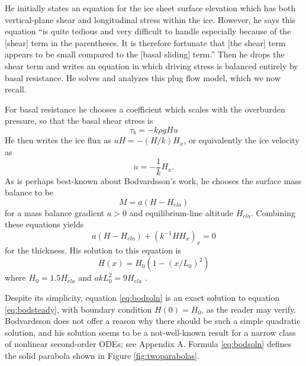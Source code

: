 \documentclass[review,letterpaper]{igs}
\begin{document}
He initially states an equation for the ice sheet surface elevation which has both vertical-plane shear and longitudinal stress within the ice.  However, he says this equation ``is quite tedious and very difficult to handle especially because of the [shear] term in the parentheses.  It is therefore fortunate that [the shear] term appears to be small compared to the [basal sliding] term.''  Then he drops the shear term and writes an equation in which driving stress is balanced entirely by basal resistance.  He solves and analyzes this plug flow model, which we now recall.

For basal resistance he chooses a coefficient which scales with the overburden pressure, so that the basal shear stress is
\begin{equation}
\tau_b = - k \rho g H u  \label{eq:bodstresschoice}
\end{equation}
He then writes the ice flux as $uH=-(H/k) H_x$, or equivalently the ice velocity as
\begin{equation}
u = - \frac{1}{k} H_x. \label{eq:bodvelocity}
\end{equation}
As is perhaps best-known about Bodvardsson's work, he chooses the surface mass balance to be
\begin{equation}
M = a (H - H_{ela})  \label{eq:bodmassbalance}
\end{equation}
for a mass balance gradient $a>0$ and equilibrium-line altitude $H_{ela}$.  Combining these equations yields \citep[equation (17)]{Bodvardsson}
\begin{equation}
a (H - H_{ela}) + (k^{-1} H H_x)_x = 0  \label{eq:bodsteady}
\end{equation}
for the thickness.  His solution to this equation is \citep[equivalent equations (18) and (23)]{Bodvardsson}
\begin{equation}
H(x) = H_0 (1 - (x/L_0)^2)  \label{eq:bodsoln}
\end{equation}
where $H_0 = 1.5 H_{ela}$ and $a k L_0^2 = 9 H_{ela}$ \citep[equation (24)]{Bodvardsson}.

Despite its simplicity, equation \eqref{eq:bodsoln} is an exact solution to equation \eqref{eq:bodsteady}, with boundary condition $H(0)=H_0$, as the reader may verify.  Bodvardsson does not offer a reason why there should be such a simple quadratic solution, and his solution seems to be a not-well-known result for a narrow class of nonlinear second-order ODEs; see Appendix A.  Formula \eqref{eq:bodsoln} defines the solid parabola shown in Figure \ref{fig:twoparabolas}.
\end{document}
